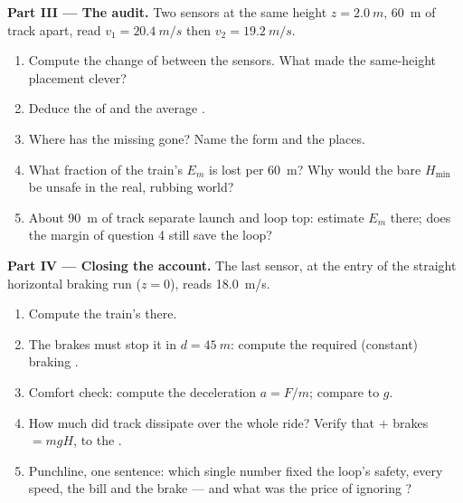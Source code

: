 \begin{problem}
\medskip
\noindent\textbf{Part III --- The  audit.}
Two sensors at the same height $z = \qty{2.0}{m}$, \qty{60}{m} of
track apart, read $v_1 = \qty{20.4}{m/s}$ then $v_2 = \qty{19.2}{m/s}$.
\begin{enumerate}[resume]
  \item Compute the change of  between the sensors.
        What made the same-height placement clever?
  \item Deduce the  of  and the average  .
  \item Where has the missing  gone? Name the form and the places.
  \item What fraction of the train's $E_m$ is lost per \qty{60}{m}? Why
        would the bare $H_{\min}$ be unsafe in the real, rubbing world?
  \item About \qty{90}{m} of track separate launch and loop top: estimate
        $E_m$ there; does the margin of question 4 still save the loop?
\end{enumerate}

\medskip
\noindent\textbf{Part IV --- Closing the account.}
The last sensor, at the entry of the straight horizontal braking run
($z = 0$), reads \qty{18.0}{m/s}.
\begin{enumerate}[resume]
  \item Compute the train's  there.
  \item The brakes must stop it in $d = \qty{45}{m}$: compute the
        required (constant) braking .
  \item Comfort check: compute the deceleration $a = F/m$; compare to $g$.
  \item How much  did track  dissipate over the whole
        ride? Verify that  $+$ brakes $= mgH$, to the .
  \item Punchline, one sentence: which single number fixed the loop's
        safety, every speed, the  bill and the brake  ---
        and what was the price of ignoring ?
\end{enumerate}
\end{problem}
